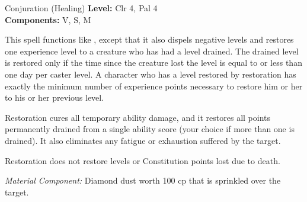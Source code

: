 {Conjuration (Healing)}
{
	\textbf{Level:}
	Clr 4, Pal 4\\
	\textbf{Components:}
	V, S, M\\
}
{
	This spell functions like , except that it also dispels negative levels and restores one experience level to a creature who has had a level drained. The drained level is restored only if the time since the creature lost the level is equal to or less than one day per caster level. A character who has a level restored by restoration has exactly the minimum number of experience points necessary to restore him or her to his or her previous level.

	Restoration cures all temporary ability damage, and it restores all points permanently drained from a single ability score (your choice if more than one is drained). It also eliminates any fatigue or exhaustion suffered by the target.

	Restoration does not restore levels or Constitution points lost due to death.

	\textit{Material Component:}
	Diamond dust worth 100 cp that is sprinkled over the target.

}

